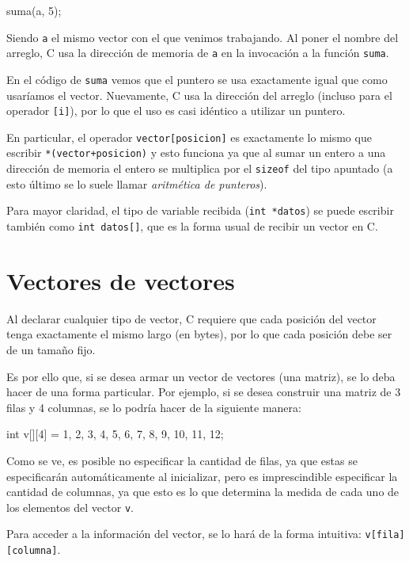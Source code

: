 \begin{codigo-c-plano}
    suma(a, 5); 
\end{codigo-c-plano}

Siendo \lstinline!a! el mismo vector con el que venimos trabajando. Al
poner el nombre del arreglo, C usa la dirección de memoria de \lstinline!a!
en la invocación a la función \lstinline!suma!.

En el código de \lstinline!suma! vemos que el puntero se usa exactamente
igual que como usaríamos el vector. Nuevamente, C usa la dirección del
arreglo (incluso para el operador \lstinline![i]!), por lo que el uso es
casi idéntico a utilizar un puntero.

En particular, el operador \lstinline!vector[posicion]! es exactamente lo
mismo que escribir \lstinline!*(vector+posicion)! y esto funciona ya que al
sumar un entero a una dirección de memoria el entero se multiplica por el
\lstinline!sizeof! del tipo apuntado (a esto último se lo suele llamar
\textit{aritmética de punteros}).

Para mayor claridad, el tipo de variable recibida (\lstinline!int *datos!)
se puede escribir también como \lstinline!int datos[]!, que es la forma
usual de recibir un vector en C.

\section{Vectores de vectores}

Al declarar cualquier tipo de vector, C requiere que cada posición del
vector tenga exactamente el mismo largo (en bytes), por lo que cada
posición debe ser de un tamaño fijo. 

Es por ello que, si se desea armar un vector de vectores (una matriz), se
lo deba hacer de una forma particular.  Por ejemplo, si se desea construir
una matriz de 3 filas y 4 columnas, se lo podría hacer de la siguiente
manera:

\begin{codigo-c-plano}
    int v[][4] = {{1, 2, 3, 4}, {5, 6, 7, 8}, {9, 10, 11, 12}};
\end{codigo-c-plano}

Como se ve, es posible no especificar la cantidad de filas, ya que estas se
especificarán automáticamente al inicializar, pero  es imprescindible
especificar la cantidad de columnas, ya que esto es lo que determina la
medida de cada uno de los elementos del vector \lstinline!v!.

Para acceder a la información del vector, se lo hará de la forma intuitiva:
\lstinline!v[fila][columna]!.

